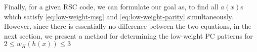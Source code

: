 
Finally, for a given RSC code, we can formulate our goal as, to find all $a(x)$s which satisfy  \eqref{eq:low-weight-msg} and  \eqref{eq:low-weight-parity} simultaneously. However, since there is essentially no difference between the two equations, in the next section, we present a method for determining the low-weight PC patterns for $2 \leq w_H(h(x)) \leq 3$



%
%

